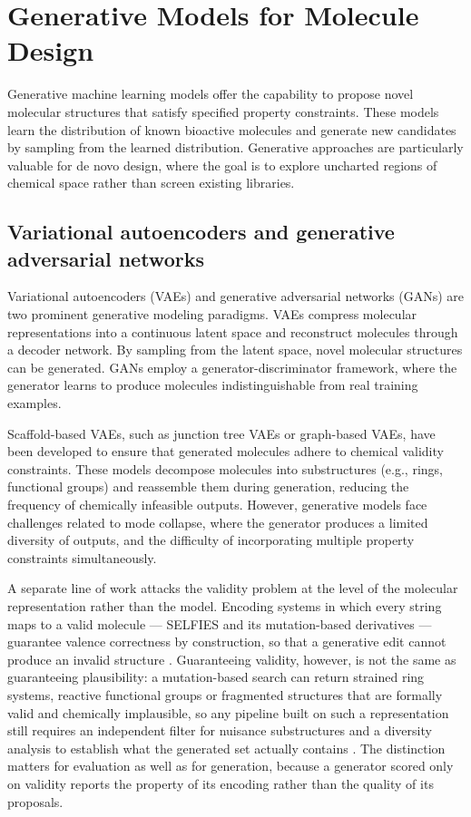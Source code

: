 \section{Generative Models for Molecule Design}

Generative machine learning models offer the capability to propose novel molecular structures that satisfy specified property constraints. These models learn the distribution of known bioactive molecules and generate new candidates by sampling from the learned distribution. Generative approaches are particularly valuable for de novo design, where the goal is to explore uncharted regions of chemical space rather than screen existing libraries.

\subsection{Variational autoencoders and generative adversarial networks}

Variational autoencoders (VAEs) and generative adversarial networks (GANs) are two prominent generative modeling paradigms. VAEs compress molecular representations into a continuous latent space and reconstruct molecules through a decoder network. By sampling from the latent space, novel molecular structures can be generated. GANs employ a generator-discriminator framework, where the generator learns to produce molecules indistinguishable from real training examples.

Scaffold-based VAEs, such as junction tree VAEs or graph-based VAEs, have been developed to ensure that generated molecules adhere to chemical validity constraints. These models decompose molecules into substructures (e.g., rings, functional groups) and reassemble them during generation, reducing the frequency of chemically infeasible outputs. However, generative models face challenges related to mode collapse, where the generator produces a limited diversity of outputs, and the difficulty of incorporating multiple property constraints simultaneously.

A separate line of work attacks the validity problem at the level of the molecular representation rather than the model. Encoding systems in which every string maps to a valid molecule --- SELFIES and its mutation-based derivatives --- guarantee valence correctness by construction, so that a generative edit cannot produce an invalid structure \cite{Nigam2021}. Guaranteeing validity, however, is not the same as guaranteeing plausibility: a mutation-based search can return strained ring systems, reactive functional groups or fragmented structures that are formally valid and chemically implausible, so any pipeline built on such a representation still requires an independent filter for nuisance substructures and a diversity analysis to establish what the generated set actually contains \cite{gomez2018automatic}. The distinction matters for evaluation as well as for generation, because a generator scored only on validity reports the property of its encoding rather than the quality of its proposals.

